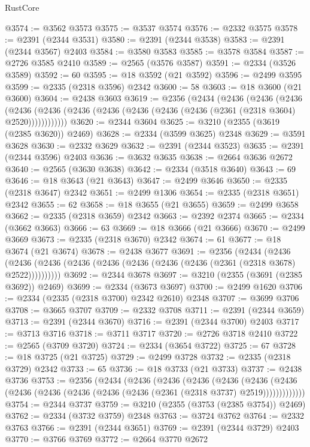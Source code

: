\begin{lexlean}{RustCore}
\begin{coremodule}
@3574 := @3562 @3573
@3575 := @3537 @3574
@3576 := @2332 @3575
@3578 := @2391 (@2344 @3531)
@3580 := @2391 (@2344 @3538)
@3583 := @2391 (@2344 @3567) @2403
@3584 := @3580 @3583
@3585 := @3578 @3584
@3587 := @2726 @3585 @2410
@3589 := @2565 (@3576 @3587)
@3591 := @2334 (@3526 @3589)
@3592 := 60
@3595 := @18 @3592 (@21 @3592)
@3596 := @2499 @3595
@3599 := @2335 (@2318 @3596) @2342
@3600 := 58
@3603 := @18 @3600 (@21 @3600)
@3604 := @2438 @3603
@3619 := @2356
    (@2434
      (@2436
        (@2436
          (@2436
            (@2436 (@2436 (@2436 (@2436 (@2436 (@2436 (@2436 (@2361 (@2318 @3604) @2520))))))))))))
@3620 := @2344 @3604
@3625 := @3210 (@2355 (@3619 (@2385 @3620)) @2469)
@3628 := @2334 (@3599 @3625) @2348
@3629 := @3591 @3628
@3630 := @2332 @3629
@3632 := @2391 (@2344 @3523)
@3635 := @2391 (@2344 @3596) @2403
@3636 := @3632 @3635
@3638 := @2664 @3636 @2672
@3640 := @2565 (@3630 @3638)
@3642 := @2334 (@3518 @3640)
@3643 := 69
@3646 := @18 @3643 (@21 @3643)
@3647 := @2499 @3646
@3650 := @2335 (@2318 @3647) @2342
@3651 := @2499 @1306
@3654 := @2335 (@2318 @3651) @2342
@3655 := 62
@3658 := @18 @3655 (@21 @3655)
@3659 := @2499 @3658
@3662 := @2335 (@2318 @3659) @2342
@3663 := @2392 @2374
@3665 := @2334 (@3662 @3663)
@3666 := 63
@3669 := @18 @3666 (@21 @3666)
@3670 := @2499 @3669
@3673 := @2335 (@2318 @3670) @2342
@3674 := 61
@3677 := @18 @3674 (@21 @3674)
@3678 := @2438 @3677
@3691 := @2356
    (@2434
      (@2436 (@2436 (@2436 (@2436 (@2436 (@2436 (@2436 (@2436 (@2361 (@2318 @3678) @2522))))))))))
@3692 := @2344 @3678
@3697 := @3210 (@2355 (@3691 (@2385 @3692)) @2469)
@3699 := @2334 (@3673 @3697)
@3700 := @2499 @1620
@3706 := @2334 (@2335 (@2318 @3700) @2342 @2610) @2348
@3707 := @3699 @3706
@3708 := @3665 @3707
@3709 := @2332 @3708
@3711 := @2391 (@2344 @3659)
@3713 := @2391 (@2344 @3670)
@3716 := @2391 (@2344 @3700) @2403
@3717 := @3713 @3716
@3718 := @3711 @3717
@3720 := @2726 @3718 @2410
@3722 := @2565 (@3709 @3720)
@3724 := @2334 (@3654 @3722)
@3725 := 67
@3728 := @18 @3725 (@21 @3725)
@3729 := @2499 @3728
@3732 := @2335 (@2318 @3729) @2342
@3733 := 65
@3736 := @18 @3733 (@21 @3733)
@3737 := @2438 @3736
@3753 := @2356
    (@2434
      (@2436
        (@2436
          (@2436
            (@2436
              (@2436
                (@2436 (@2436 (@2436 (@2436 (@2436 (@2436 (@2361 (@2318 @3737) @2519)))))))))))))
@3754 := @2344 @3737
@3759 := @3210 (@2355 (@3753 (@2385 @3754)) @2469)
@3762 := @2334 (@3732 @3759) @2348
@3763 := @3724 @3762
@3764 := @2332 @3763
@3766 := @2391 (@2344 @3651)
@3769 := @2391 (@2344 @3729) @2403
@3770 := @3766 @3769
@3772 := @2664 @3770 @2672

\end{coremodule}
\end{lexlean}
